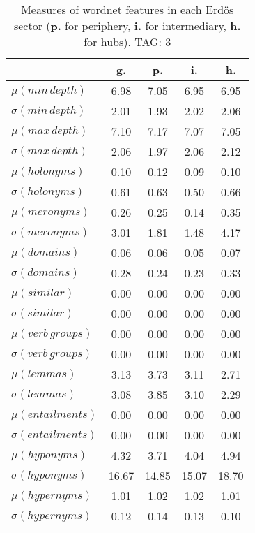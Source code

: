 \begin{table}[h!]
\begin{center}
\begin{tabular}{| l || c | c | c | c |}\hline
 & {\bf g.} & {\bf p.} & {\bf i.} & {\bf h.} \\\hline\hline
$\mu(min\,depth)$ & 6.98  & 7.05  & 6.95  & 6.95 \\
$\sigma(min\,depth)$ & 2.01  & 1.93  & 2.02  & 2.06 \\\hline
$\mu(max\,depth)$ & 7.10  & 7.17  & 7.07  & 7.05 \\
$\sigma(max\,depth)$ & 2.06  & 1.97  & 2.06  & 2.12 \\\hline
$\mu(holonyms)$ & 0.10  & 0.12  & 0.09  & 0.10 \\
$\sigma(holonyms)$ & 0.61  & 0.63  & 0.50  & 0.66 \\\hline
$\mu(meronyms)$ & 0.26  & 0.25  & 0.14  & 0.35 \\
$\sigma(meronyms)$ & 3.01  & 1.81  & 1.48  & 4.17 \\\hline
$\mu(domains)$ & 0.06  & 0.06  & 0.05  & 0.07 \\
$\sigma(domains)$ & 0.28  & 0.24  & 0.23  & 0.33 \\\hline
$\mu(similar)$ & 0.00  & 0.00  & 0.00  & 0.00 \\
$\sigma(similar)$ & 0.00  & 0.00  & 0.00  & 0.00 \\\hline
$\mu(verb\,groups)$ & 0.00  & 0.00  & 0.00  & 0.00 \\
$\sigma(verb\,groups)$ & 0.00  & 0.00  & 0.00  & 0.00 \\\hline
$\mu(lemmas)$ & 3.13  & 3.73  & 3.11  & 2.71 \\
$\sigma(lemmas)$ & 3.08  & 3.85  & 3.10  & 2.29 \\\hline
$\mu(entailments)$ & 0.00  & 0.00  & 0.00  & 0.00 \\
$\sigma(entailments)$ & 0.00  & 0.00  & 0.00  & 0.00 \\\hline
$\mu(hyponyms)$ & 4.32  & 3.71  & 4.04  & 4.94 \\
$\sigma(hyponyms)$ & 16.67  & 14.85  & 15.07  & 18.70 \\\hline
$\mu(hypernyms)$ & 1.01  & 1.02  & 1.02  & 1.01 \\
$\sigma(hypernyms)$ & 0.12  & 0.14  & 0.13  & 0.10 \\\hline
\end{tabular}
\caption{Measures of wordnet features in each Erd\"os sector ({{\bf p.}} for periphery, {{\bf i.}} for intermediary, {{\bf h.}} for hubs). TAG: 3}
\end{center}
\end{table}
